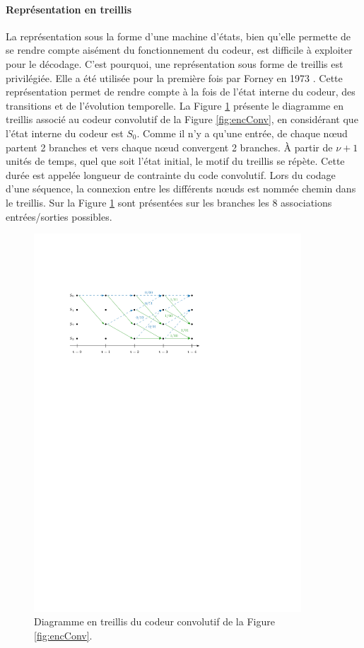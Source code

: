 \paragraph*{Représentation en treillis}
La représentation sous la forme d'une machine d'états, bien qu'elle permette de se rendre compte aisément du fonctionnement du 
codeur, est difficile à exploiter pour le décodage. C'est pourquoi, une représentation sous forme de treillis est privilégiée. Elle a
été utilisée pour la première fois par Forney en 1973 \cite{forney73viterbi}. Cette
représentation permet de rendre compte à la fois de l'état interne du codeur, des transitions et de l'évolution 
temporelle. La Figure \ref{fig:trellis} présente le diagramme en treillis associé au codeur convolutif de la Figure 
\ref{fig:encConv}, en considérant que l'état interne du codeur est $S_0$. Comme il n'y a qu'une entrée, de chaque nœud 
partent 2 branches et vers chaque nœud convergent 2 branches. À partir de $\nu+1$ unités de temps, quel que soit l'état 
initial, le motif du treillis se répète. Cette durée est appelée longueur de contrainte du code convolutif. Lors du 
codage d'une séquence, la connexion entre les différents nœuds est nommée chemin dans le treillis. Sur la Figure  
\ref{fig:trellis} sont présentées sur les branches les 8 associations entrées/sorties possibles.
\begin{figure}[!h]
	\centering
	\includegraphics[width=10cm]{main/ch1_fig/trellis.pdf}
	\caption{\label{fig:trellis} Diagramme en treillis du codeur convolutif de la Figure \ref{fig:encConv}.}
\end{figure}

